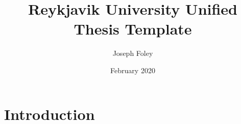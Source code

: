 \documentclass{article}
\title{Reykjavik University Unified Thesis Template}
\author{Joseph Foley}
\date{February 2020}
\begin{document}
\maketitle

\section{Introduction}
\end{document}
